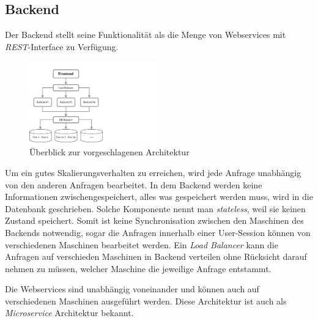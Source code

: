 \subsection{Backend}

Der Backend stellt seine Funktionalität als die Menge von Webservices mit \textit{REST}-Interface zu Verfügung.

\begin{figure}[H]
\centering
\includegraphics[trim = 0mm 0mm 0mm 0mm, clip, width=0.5\textwidth]{resources/ueberblickArchitektur}
\caption[Überblick zur vorgeschlagenen Architektur]{Überblick zur vorgeschlagenen Architektur}
\label{img:ueberblickArchitektur}
\end{figure}

Um ein gutes Skalierungsverhalten zu erreichen, wird jede Anfrage unabhängig von den anderen Anfragen bearbeitet. In dem Backend werden keine Informationen zwischengespeichert, alles was gespeichert werden muss, wird in die Datenbank geschrieben. Solche Komponente nennt man \textit{stateless}, weil sie keinen Zustand speichert. Somit ist keine Synchronisation zwischen den Maschinen des Backends notwendig, sogar die Anfragen innerhalb einer User-Session können von verschiedenen Maschinen bearbeitet werden. Ein \textit{Load Balancer} kann die Anfragen auf verschieden Maschinen in Backend verteilen ohne Rücksicht darauf nehmen zu müssen, welcher Maschine die jeweilige Anfrage entstammt.

Die Webservices sind unabhängig voneinander und können auch auf verschiedenen Maschinen ausgeführt werden. Diese Architektur ist auch als \textit{Microservice} Architektur bekannt.

